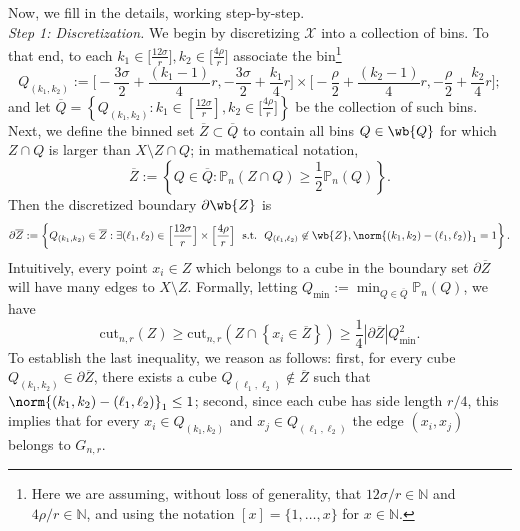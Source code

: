 \documentclass[twoside,11pt]{article}
\newcommand{\abs}[1]{\left \lvert #1 \right \rvert}
\newcommand{\set}[1]{\left\{#1\right\}}
\newcommand{\1}{\mathbf{1}}
\newcommand{\mc}[1]{\mathcal{#1}}
\newcommand{\Pbb}{\mathbb{P}}
\newcommand{\cut}{\mathrm{cut}}
\begin{document}
Now, we fill in the details, working step-by-step.\\

\noindent \emph{Step 1: Discretization.}
We begin by discretizing $\mc{X}$ into a collection of bins. To that end, to each $k_1 \in \bigl[\frac{12\sigma}{r}\bigr], k_2 \in \bigl[\frac{4\rho}{r}\bigr]$ associate the bin\footnote{Here we are assuming, without loss of generality, that $12\sigma/r \in \mathbb{N}$ and $4\rho/r \in \mathbb{N}$, and using the notation $[x] = \{1,\ldots,x\}$ for $x \in \mathbb{N}$.}
\begin{equation*}
Q_{(k_1,k_2)} := \biggl[-\frac{3\sigma}{2} + \frac{(k_1 - 1)}{4}r, -\frac{3\sigma}{2} + \frac{k_1}{4}r\biggr] \times \biggl[-\frac{\rho}{2} + \frac{(k_2 - 1)}{4}r, -\frac{\rho}{2} + \frac{k_2}{4}r\biggr];
\end{equation*}
and let $\overline{Q} = \set{Q_{(k_1,k_2)}: k_1 \in \left[\frac{12\sigma}{r}\right], k_2 \in \bigl[\frac{4\rho}{r}\bigr]}$ be the collection of such bins. Next, we define the binned set $\overline{Z} \subset \overline{Q}$ to contain all bins $Q \in \wb{Q}$ for which $Z \cap Q$ is larger than $X\setminus Z \cap Q$; in mathematical notation,
\begin{equation*}
\overline{Z} := \set{Q \in \overline{Q}: \Pbb_n(Z \cap Q) \geq \frac{1}{2}\Pbb_n(Q)}.
\end{equation*}
Then the discretized boundary $\partial \wb{Z}$ is 
\begin{equation*}
\partial \overline{Z} := \set{Q_{(k_1,k_2)} \in \overline{Z}: \exists (\ell_1,\ell_2) \in \Bigl[\frac{12\sigma}{r}\Bigr] \times \Bigl[\frac{4\rho}{r}\Bigr]~~\textrm{s.t.}~~Q_{(\ell_1,\ell_2)} \not\in \wb{Z}, \norm{(k_1,k_2) - (\ell_1,\ell_2)}_1 = 1}.
\end{equation*}
Intuitively, every point $x_i \in Z$ which belongs to a cube in the boundary set $\partial\overline{Z}$ will have many edges to $X\setminus Z$. Formally, letting $Q_{\min} := \min_{Q \in \overline{Q}} \Pbb_n(Q)$, we have
\begin{equation}
\label{eqn:normalized_cut_lb_pf1}
\cut_{n,r}(Z) \geq \cut_{n,r}(Z \cap \set{x_i \in \overline{Z}}) \geq \frac{1}{4} \abs{\partial \overline{Z}} Q_{\min}^2.
\end{equation}
To establish the last inequality, we reason as follows: first, for every cube $Q_{(k_1,k_2)} \in \partial\overline{Z}$, there exists a cube $Q_{(\ell_1,\ell_2)} \not\in \overline{Z}$ such that $\norm{(k_1,k_2) - (\ell_1,\ell_2)}_1 \leq 1$; second, since each cube has side length $r/4$, this implies that for every $x_i \in Q_{(k_1,k_2)}$ and $x_j \in Q_{(\ell_1,\ell_2)}$ the edge $(x_i,x_j)$ belongs to $G_{n,r}$.\\ 
\end{document}
